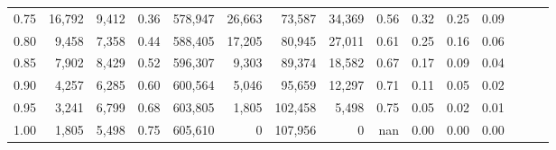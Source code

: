 \begin{tabular}{rrrrrrrrrrrrrrr}
0.75 &  16,792 &  9,412 &  0.36 &  578,947 &   26,663 &   73,587 &   34,369 &  0.56 &  0.32 &  0.25 &      0.09 \\
0.80 &   9,458 &  7,358 &  0.44 &  588,405 &   17,205 &   80,945 &   27,011 &  0.61 &  0.25 &  0.16 &      0.06 \\
0.85 &   7,902 &  8,429 &  0.52 &  596,307 &    9,303 &   89,374 &   18,582 &  0.67 &  0.17 &  0.09 &      0.04 \\
0.90 &   4,257 &  6,285 &  0.60 &  600,564 &    5,046 &   95,659 &   12,297 &  0.71 &  0.11 &  0.05 &      0.02 \\
0.95 &   3,241 &  6,799 &  0.68 &  603,805 &    1,805 &  102,458 &    5,498 &  0.75 &  0.05 &  0.02 &      0.01 \\
1.00 &   1,805 &  5,498 &  0.75 &  605,610 &        0 &  107,956 &        0 &   nan &  0.00 &  0.00 &      0.00 \\
\bottomrule
\end{tabular}

